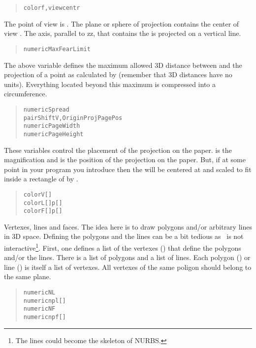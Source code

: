 \begin{quote}
\begin{alltt}
color f, viewcentr
\end{alltt}
\end{quote}
The point of view is . The plane or sphere
of projection contains
the center of view .
The axis, parallel to zz, that contains the
 is projected on a vertical line.
\begin{quote}
\begin{alltt}
numeric MaxFearLimit
\end{alltt}
\end{quote}
The above variable defines the maximum allowed 3D distance between
 and the projection of a point as calculated by
 (remember that 3D distances have no units). Everything
located beyond this maximum is compressed into a circumference.  
\begin{quote}
\begin{alltt}
numeric Spread
pair ShiftV, OriginProjPagePos
numeric PageWidth
numeric PageHeight
\end{alltt}
\end{quote}
These variables control
the placement of the projection on the
paper.  is the magnification
and  is the position of the
 projection on the
paper. But, if at some point in your program you introduce
 then the
 will be
centered at 
and scaled to fit inside a rectangle of
 by .
\begin{quote}
\begin{alltt}
color V[]
color L[]p[]
color F[]p[]
\end{alltt}
\end{quote}
Vertexes, lines and faces.
The idea here is to draw
polygons and/or arbitrary lines in 3D space.
Defining the polygons and
the lines can be a bit tedious as \FP\ is not
interactive\footnote{The lines could become the skeleton of NURBS.}. 
First, one defines a list of the
vertexes () that define the
polygons and/or the lines.
There is a list of polygons and a list of
lines. Each polygon () or
line () is itself a list of vertexes.
All vertexes of the same poligon should belong
to the same plane.
\begin{quote}
\begin{alltt}
numeric NL
numeric npl[]
numeric NF
numeric npf[]
\end{alltt}
\end{quote}
